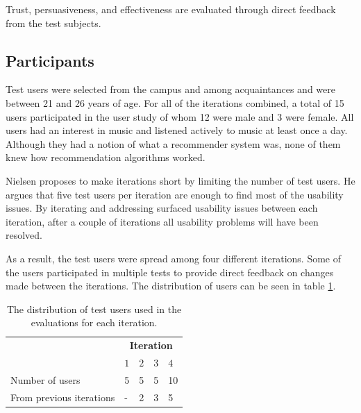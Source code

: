 \documentclass[a4paper,10pt,twocolumn]{article}
\begin{document}
Trust, persuasiveness, and effectiveness are evaluated through direct feedback from the test subjects.

\subsection{Participants}\label{section:evaluation:subsection:setup}

Test users were selected from the campus and among acquaintances and were between 21 and 26 years of age. For all of the iterations combined, a total of 15 users participated in the user study of whom 12 were male and 3 were female. All users had an interest in music and listened actively to music at least once a day. Although they had a notion of what a recommender system was, none of them knew how recommendation algorithms worked.

Nielsen \cite{nielsen:2012:nngroup:diminishing_returns} proposes to make iterations short by limiting the number of test users. He argues that five test users per iteration are enough to find most of the usability issues. By iterating and addressing surfaced usability issues between each iteration, after a couple of iterations all usability problems will have been resolved.

As a result, the test users were spread among four different iterations. Some of the users participated in multiple tests to provide direct feedback on changes made between the iterations. The distribution of users can be seen in table \ref{table:evaluation:users}.

\begin{table}
	\caption{The distribution of test users used in the evaluations for each iteration.}
	\begin{tabular}{l | l l l l }
		\hline
															& \multicolumn{4}{c}{\textbf{Iteration}} \\
															\cline{2-5}
															& $1$ & $2$ & $3$ & $4$ \\
		\hline
		Number of users						&	5 	&	5		&	5		&	10	\\
		From previous iterations	&	-  	&	2 	&	3		&	5	\\
		\hline
	\end{tabular}
	\label{table:evaluation:users}
\end{table}
\end{document}

